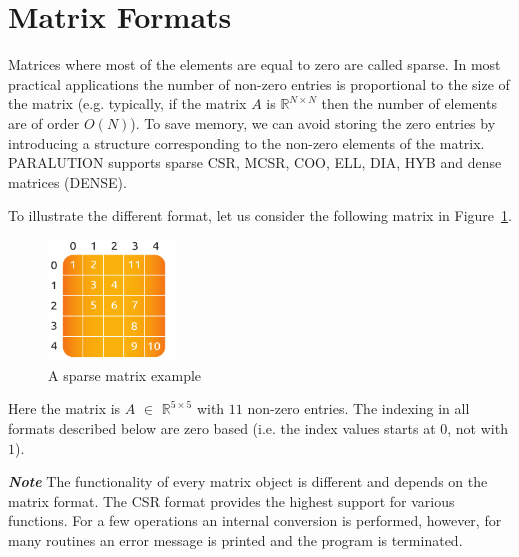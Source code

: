 


\section{Matrix Formats}

Matrices where most of the elements are equal to zero are called sparse. In most practical applications the number of non-zero entries is proportional to the size of the matrix (e.g. typically, if the matrix $A$ is $\mathbb{R}^{N \times N}$ then the number of elements are of order $O(N)$). To save memory, we can avoid storing the zero entries by introducing a structure corresponding to the non-zero elements of the matrix. PARALUTION supports sparse CSR, MCSR, COO, ELL, DIA, HYB and dense matrices (DENSE). 

To illustrate the different format, let us consider the following matrix in Figure~\ref{sparse-matrix-example}.
%
%
\begin{figure}[!ht]
\centering
\includegraphics[width=0.3\textwidth]{./fig/mat/matrix.pdf}
\caption{A sparse matrix example}
\label{sparse-matrix-example}
\end{figure}
%

Here the matrix is $A$ $\in$ $\mathbb{R}^{5 \times 5}$ with $11$ non-zero entries. The indexing in all formats described below are zero based (i.e. the index values starts at $0$, not with $1$).

\textbf{\emph{Note}} The functionality of every matrix object is different and depends on the matrix format. The CSR format provides the highest support for various functions. For a few operations an internal conversion is performed, however, for many routines an error message is printed and the program is terminated.


